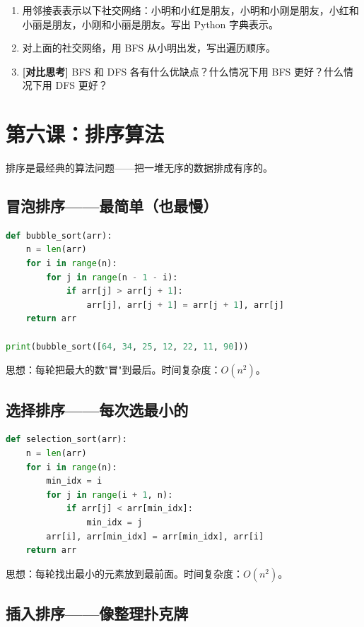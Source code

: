 \documentclass[a4paper,12pt]{ctexart}
\begin{document}
\begin{enumerate}
  \item 用邻接表表示以下社交网络：小明和小红是朋友，小明和小刚是朋友，小红和小丽是朋友，小刚和小丽是朋友。写出 Python 字典表示。
  \item 对上面的社交网络，用 BFS 从小明出发，写出遍历顺序。
  \item \textbf{[对比思考]} BFS 和 DFS 各有什么优缺点？什么情况下用 BFS 更好？什么情况下用 DFS 更好？
\end{enumerate}

\section*{第六课：排序算法}

排序是最经典的算法问题——把一堆无序的数据排成有序的。

\subsection*{冒泡排序——最简单（也最慢）}

\begin{lstlisting}[language=Python]
def bubble_sort(arr):
    n = len(arr)
    for i in range(n):
        for j in range(n - 1 - i):
            if arr[j] > arr[j + 1]:
                arr[j], arr[j + 1] = arr[j + 1], arr[j]
    return arr

print(bubble_sort([64, 34, 25, 12, 22, 11, 90]))
\end{lstlisting}

思想：每轮把最大的数"冒"到最后。时间复杂度：$O(n^2)$。

\subsection*{选择排序——每次选最小的}

\begin{lstlisting}[language=Python]
def selection_sort(arr):
    n = len(arr)
    for i in range(n):
        min_idx = i
        for j in range(i + 1, n):
            if arr[j] < arr[min_idx]:
                min_idx = j
        arr[i], arr[min_idx] = arr[min_idx], arr[i]
    return arr
\end{lstlisting}

思想：每轮找出最小的元素放到最前面。时间复杂度：$O(n^2)$。

\subsection*{插入排序——像整理扑克牌}
\end{document}
